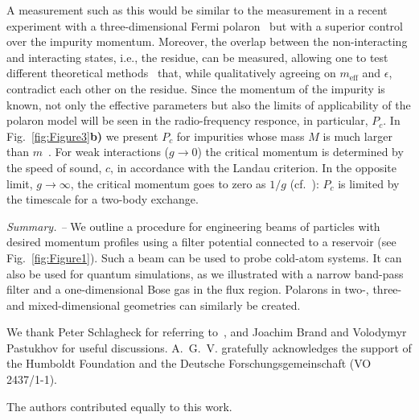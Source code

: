 \documentclass[twocolumn,amsmath,amssymb,showpacs,pra,superscriptaddress,aps]{revtex4-1}
\begin{document}
A measurement such as this would be similar to the measurement in a recent experiment with a three-dimensional Fermi polaron~\cite{zaccanti2017} but 
with a superior control over the impurity momentum. 
Moreover, the overlap between the non-interacting and interacting states, i.e., the residue, can
be measured, allowing one to test different theoretical methods~\cite{volosniev2017, pastukhov2017,grusdt2017,pastukhov2018}
that, while qualitatively agreeing on $m_{\mathrm{eff}}$ and $\epsilon$, contradict each other on the residue.
Since the momentum of the impurity is known, not only the effective parameters but also the limits of applicability 
of the polaron model will be seen in the radio-frequency responce, in particular, $P_c$.
In Fig.~\ref{fig:Figure3}{\bf b)} we present $P_c$ for impurities whose mass $M$ is much larger than $m$~\cite{hakim1997}.
For weak interactions ($g\to 0$) the critical momentum is determined by the speed of sound, $c$, in accordance with the Landau criterion.
In the opposite limit, $g\to \infty$, the critical momentum goes to zero as $1/g$ (cf.~\cite{kamenev2016}):   
$P_c$ is limited by the timescale for a two-body exchange. 
 



{\it Summary. --}  We outline a procedure for engineering beams of particles with desired momentum profiles using a filter potential connected to a reservoir (see Fig.~\ref{fig:Figure1}). Such a beam can be used to probe cold-atom systems. It can also be used for quantum simulations, as we illustrated with a narrow band-pass filter and a one-dimensional Bose gas in the flux region. Polarons in two-, three- and mixed-dimensional geometries can similarly be created. 

\vspace*{1em}


\begin{acknowledgments}
We thank Peter Schlagheck for referring to~\cite{Schlagheck2005},
and Joachim Brand and Volodymyr Pastukhov for useful discussions.
A.~G.~V. gratefully acknowledges the support of the Humboldt Foundation and the Deutsche Forschungsgemeinschaft
(VO 2437/1-1).

\vspace*{1em}

The authors contributed equally to this work.
\end{acknowledgments}






 
\end{document}
